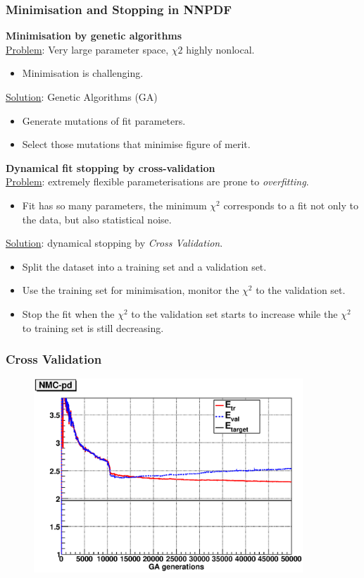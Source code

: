 \documentclass[10pt]{beamer}
\begin{document}
\begin{frame}
\small
\frametitle{Minimisation and Stopping in NNPDF}
\textbf{Minimisation by genetic algorithms}\\
\underline{Problem}: Very large parameter space, $\chi2$ highly nonlocal. \begin{itemize}
\item<1-> Minimisation is challenging.
\end{itemize}\underline{Solution}: Genetic Algorithms (GA)
\begin{itemize}
\item<1-> Generate mutations of fit parameters.
\item<1-> Select those mutations that minimise figure of merit.
\end{itemize}
\vskip10pt
\textbf{ Dynamical fit stopping by cross-validation}\\
\underline{Problem}:  extremely flexible parameterisations are prone to \emph{overfitting}.
\\
\begin{itemize}
\item<1->Fit has so many parameters, the minimum $\chi^2$ corresponds to a fit not only to
the data, but also statistical noise.
\end{itemize}
\underline{Solution}:  dynamical stopping by \emph{Cross Validation}.
\begin{itemize}
\item<1-> Split the dataset into a training set and a validation set.
\item<1-> Use the training set for minimisation, monitor the $\chi^2$ to the validation set.
\item<1-> Stop the fit when the $\chi^2$ to the validation set starts to increase while
the $\chi^2$ to training set is still decreasing.

\end{itemize}
\end{frame}


\begin{frame}
\frametitle{Cross Validation}
 \begin{figure}[b!]
    \begin{center}
      \includegraphics[width=0.9\textwidth]{chi2ite-1004-NMC-pd.eps}
    \end{center}
\end{figure}
\end{frame}
\end{document}
